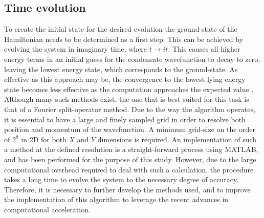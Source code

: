 \subsection{Time evolution}
To create the initial state for the desired evolution the ground-state of the Hamiltonian needs to be determined as a first step. This can be achieved by evolving the system in imaginary time, where $t\rightarrow it$. This causes all higher energy terms in an initial guess for the condensate wavefunction to decay to zero, leaving the lowest energy state, which corresponds to the ground-state. As effective as this approach may be, the convergence to the lowest lying energy state becomes less effective as the computation approaches the expected value \cite{Vtx:Danaila_pra_2005}. Although many such methods exist, the one that is best suited for this task is that of a Fourier
split-operator method. Due to the way the algorithm operates, it is essential to have a large and finely sampled grid in order to resolve both position and momentum of the
wavefunction. A minimum grid-size on the order of $2^8$ in 2D for both $X$ and $Y$ dimensions is required. An implementation
of such a method at the defined resolution is a straight-forward process using MATLAB, and has been performed for the purpose of this study.
However, due to the large computational overhead required to deal with such a calculation, the procedure takes a long time to evolve the system to the necessary degree of accuracy. Therefore, it is necessary to further develop the methods used, and to improve the implementation of this algorithm to leverage the recent advances in computational acceleration.

